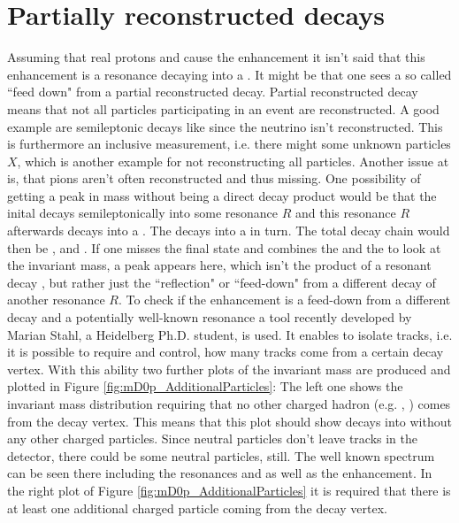 \section{Partially reconstructed decays}
Assuming that real protons and \Dz cause the enhancement it isn't said that this enhancement is a resonance decaying into a \Dz\proton.
It might be that one sees a so called ``feed down" from a partial reconstructed decay.
Partial reconstructed decay means that not all particles participating in an event are reconstructed.
A good example are semileptonic decays like \LbToDpmunuX since the neutrino isn't reconstructed.
This is furthermore an inclusive measurement, i.e. there might some unknown particles $X$, which is another example for not reconstructing all particles.
Another issue at \lhcb is, that pions aren't often reconstructed and thus missing.
One possibility of getting a peak in \Dz\proton mass without being a direct decay product would be that the inital \Lb decays semileptonically into some resonance $R$ and this resonance $R$ afterwards decays into a \Dstar\proton.
The \Dstar decays into a \D\pion in turn.
The total decay chain would then be ,  and \decay{\Dstar}{\D\pion}.
If one misses the final state \pion and combines the \D and the \proton to look at the invariant \D\proton mass, a peak appears here, which isn't the product of a resonant decay , but rather just the ``reflection" or ``feed-down" from a different decay of another
resonance $R$.
To check if the enhancement is a feed-down from a different decay and a potentially well-known resonance a tool recently developed by Marian Stahl, a Heidelberg Ph.D. student, is used.
It enables to isolate tracks, i.e. it is possible to require and control, how many tracks come from a certain decay vertex.
With this ability two further plots of the \Dz\proton invariant mass are produced and plotted in Figure \ref{fig:mD0p_AdditionalParticles}:
The left one shows the invariant \Dz\proton mass distribution requiring that no other charged hadron (e.g. \pion, \kaon) comes from the \Dz\proton\mun decay vertex.
This means that this plot should show \Lb decays into \Dz\proton\mun without any other charged particles.
Since neutral particles don't leave tracks in the detector, there could be some neutral particles, still.
The well known \Dz\proton spectrum can be seen there including the resonances \LcResI and \LcResII as well as the enhancement.
In the right plot of Figure \ref{fig:mD0p_AdditionalParticles} it is required that there is at least one additional charged particle coming from the \Dz\proton\mun decay vertex.
